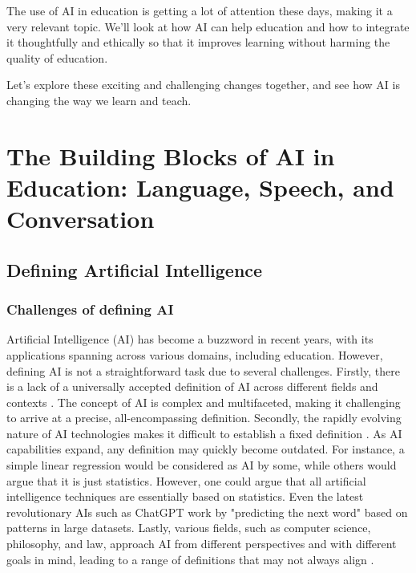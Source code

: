 \documentclass{article}
\begin{document}
The use of AI in education is getting a lot of attention these days, making it a very relevant topic. We'll look at how AI can help education and how to integrate it thoughtfully and ethically so that it improves learning without harming the quality of education.

Let's explore these exciting and challenging changes together, and see how AI is changing the way we learn and teach.

\newpage
\section{The Building Blocks of AI in Education: Language, Speech, and Conversation}
\subsection{Defining Artificial Intelligence}

\subsubsection{Challenges of defining AI}


Artificial Intelligence (AI) has become a buzzword in recent years, with its
applications spanning across various domains, including education. However,
defining AI is not a straightforward task due to several challenges. Firstly,
there is a lack of a universally accepted definition of AI across different
fields and contexts \cite{Eliot2021DifficultiesIL}.
The concept of AI is complex and multifaceted, making it challenging to arrive
at a precise, all-encompassing definition. Secondly, the rapidly evolving
nature of AI technologies makes it difficult to establish a fixed
definition \cite{Tambuskar2022ChallengesAB} \cite{Cooreman2022CriticalRO}.
As AI capabilities expand, any definition may quickly become outdated.
For instance, a simple linear regression
would be considered as AI by some, while others would argue that it is
just statistics. However, one could argue that all
artificial intelligence techniques are essentially based on statistics.
Even the latest revolutionary AIs such as ChatGPT work by "predicting the next word" based
on patterns in large datasets. Lastly, various fields, such as computer
science, philosophy, and law, approach AI from different perspectives and
with different goals in mind, leading to a range of definitions that may
not always align \cite{Simonsen2022OpenRO} \cite{Rienties2020DefiningTB}.
\end{document}
